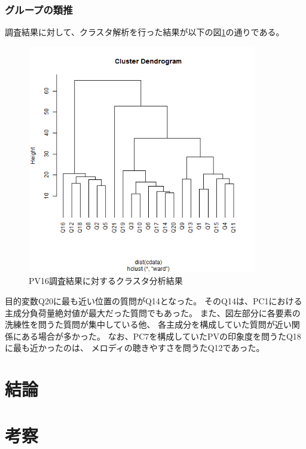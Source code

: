 \documentclass[11pt,a4paper, uplatex]{jsarticle}
\begin{document}
\subsubsection{グループの類推}
調査結果に対して、クラスタ解析を行った結果が以下の図\ref{fig:clusterPV}の通りである。
\begin{figure}[h]
  \begin{center}
    \includegraphics[width=10cm]{clusterPV.bmp}
    \caption{PV16調査結果に対するクラスタ分析結果}
    \label{fig:clusterPV}
  \end{center}
\end{figure}
目的変数Q20に最も近い位置の質問がQ14となった。
そのQ14は、PC1における主成分負荷量絶対値が最大だった質問でもあった。
また、図左部分に各要素の洗練性を問うた質問が集中している他、
各主成分を構成していた質問が近い関係にある場合が多かった。
なお、PC7を構成していたPVの印象度を問うたQ18に最も近かったのは、
メロディの聴きやすさを問うたQ12であった。

\section{結論}
\section{考察}
\end{document}
